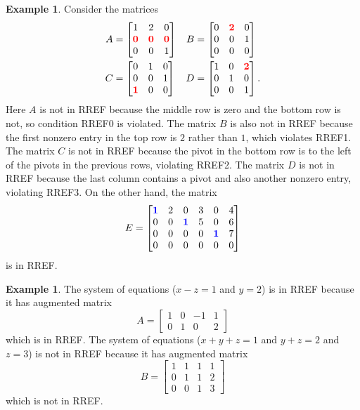 \documentclass[reqno]{amsart}
\theoremstyle{definition}
\newtheorem{example}[theorem]{Example}
\newcommand{\idx}[1]{{#1}\index{#1}}
\begin{document}
\begin{example}\label{eg-rref-matrices}
 Consider the matrices
 \begin{align*}
  A &= \left[\begin{matrix} 1 & 2 & 0 \\
            {\color{red}\textbf{0}} & {\color{red}\textbf{0}} & {\color{red}\textbf{0}} \\
            0 & 0 & 1 \end{matrix}\right] &
  B &= \left[\begin{matrix} 0 & {\color{red}\textbf{2}} & 0 \\ 0 & 0 & 1 \\ 0 & 0 & 0 \end{matrix}\right] \\
  C &= \left[\begin{matrix} 0 & 1 & 0 \\ 0 & 0 & 1 \\ {\color{red}\textbf{1}} & 0 & 0 \end{matrix}\right] &
  D &= \left[\begin{matrix} 1 & 0 & {\color{red}\textbf{2}} \\ 0 & 1 & 0 \\ 0 & 0 & 1 \end{matrix}\right].
 \end{align*}
 Here $A$ is not in RREF because the middle row is zero and the bottom
 row is not, so condition RREF0 is violated.  The matrix $B$ is also
 not in RREF because the first nonzero entry in the top row is $2$
 rather than $1$, which violates RREF1.  The matrix $C$ is not in RREF
 because the pivot in the bottom row is to the left of the pivots in
 the previous rows, violating RREF2.  The matrix $D$ is not in RREF
 because the last column contains a pivot and also another nonzero
 entry, violating RREF3.  On the other hand, the matrix
 \[ E = \left[\begin{matrix}
  {\color{blue}\textbf{1}} & 2 & 0 & 3 & 0 & 4 \\
  0 & 0 & {\color{blue}\textbf{1}} & 5 & 0 & 6 \\
  0 & 0 & 0 & 0 & {\color{blue}\textbf{1}} & 7 \\
  0 & 0 & 0 & 0 & 0 & 0
 \end{matrix}\right] \]
 is in RREF.
\end{example}

\begin{example}\label{eg-rref-eqs}
 The system of equations ($x-z=1$ and $y=2$) is in RREF because it
 has \idx{augmented matrix}
 \[ A =
     \left[\begin{array}{ccc|c} 1&0&-1&1 \\ 0&1&0&2 \end{array}\right]
 \]
 which is in RREF.  The system of equations ($x+y+z=1$ and $y+z=2$ and
 $z=3$) is not in RREF because it has augmented matrix
 \[ B =
     \left[\begin{array}{ccc|c}
       1&1&1&1 \\ 0&1&1&2 \\ 0&0&1&3
     \end{array}\right]
 \]
 which is not in RREF.
\end{example}
\end{document}

